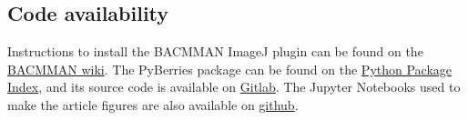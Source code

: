 \subsection*{Code availability}
Instructions to install the BACMMAN ImageJ plugin can be found on the \href{https://github.com/jeanollion/bacmman/wiki/Installation}{BACMMAN wiki}. The PyBerries package can be found on the \href{https://pypi.org/project/PyBerries/}{Python Package Index}, and its source code is available on \href{https://gitlab.com/MEKlab/pyberries}{Gitlab}. The Jupyter Notebooks used to make the article figures are also available on \href{https://github.com/DanielThedie/RecB_article}{github}.


